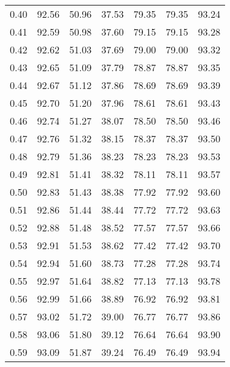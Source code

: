 \begin{tabular}{|c|c|c|c|c|c|c|}
      0.40 &     92.56 &     50.96 &      37.53 &   79.35 &      79.35 &         93.24 \\
      0.41 &     92.59 &     50.98 &      37.60 &   79.15 &      79.15 &         93.28 \\
      0.42 &     92.62 &     51.03 &      37.69 &   79.00 &      79.00 &         93.32 \\
      0.43 &     92.65 &     51.09 &      37.79 &   78.87 &      78.87 &         93.35 \\
      0.44 &     92.67 &     51.12 &      37.86 &   78.69 &      78.69 &         93.39 \\
      0.45 &     92.70 &     51.20 &      37.96 &   78.61 &      78.61 &         93.43 \\
      0.46 &     92.74 &     51.27 &      38.07 &   78.50 &      78.50 &         93.46 \\
      0.47 &     92.76 &     51.32 &      38.15 &   78.37 &      78.37 &         93.50 \\
      0.48 &     92.79 &     51.36 &      38.23 &   78.23 &      78.23 &         93.53 \\
      0.49 &     92.81 &     51.41 &      38.32 &   78.11 &      78.11 &         93.57 \\
      0.50 &     92.83 &     51.43 &      38.38 &   77.92 &      77.92 &         93.60 \\
      0.51 &     92.86 &     51.44 &      38.44 &   77.72 &      77.72 &         93.63 \\
      0.52 &     92.88 &     51.48 &      38.52 &   77.57 &      77.57 &         93.66 \\
      0.53 &     92.91 &     51.53 &      38.62 &   77.42 &      77.42 &         93.70 \\
      0.54 &     92.94 &     51.60 &      38.73 &   77.28 &      77.28 &         93.74 \\
      0.55 &     92.97 &     51.64 &      38.82 &   77.13 &      77.13 &         93.78 \\
      0.56 &     92.99 &     51.66 &      38.89 &   76.92 &      76.92 &         93.81 \\
      0.57 &     93.02 &     51.72 &      39.00 &   76.77 &      76.77 &         93.86 \\
      0.58 &     93.06 &     51.80 &      39.12 &   76.64 &      76.64 &         93.90 \\
      0.59 &     93.09 &     51.87 &      39.24 &   76.49 &      76.49 &         93.94 \\

\end{tabular}
